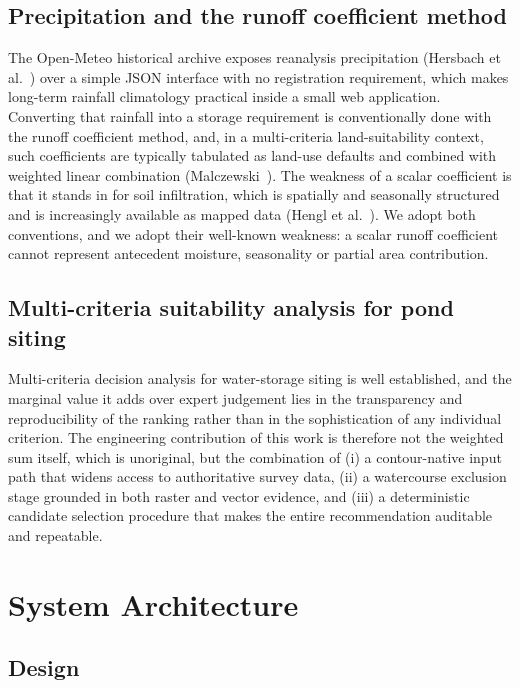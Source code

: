 \documentclass[sigconf,review,10pt]{acmart}
\begin{document}
\subsection{Precipitation and the runoff coefficient method}

The Open-Meteo historical archive exposes reanalysis precipitation
(Hersbach et al.~\cite{hersbach2020}) over a simple JSON interface with
no registration requirement, which makes long-term rainfall climatology
practical inside a small web application. Converting that rainfall into a
storage requirement is conventionally done with the runoff coefficient
method, and, in a multi-criteria land-suitability context, such
coefficients are typically tabulated as land-use defaults and combined
with weighted linear combination (Malczewski~\cite{malczewski1999}). The
weakness of a scalar coefficient is that it stands in for soil
infiltration, which is spatially and seasonally structured and is
increasingly available as mapped data (Hengl et al.~\cite{hengl2017}). We
adopt both conventions, and we adopt their well-known weakness: a scalar
runoff coefficient cannot represent antecedent moisture, seasonality or
partial area contribution.

\subsection{Multi-criteria suitability analysis for pond siting}

Multi-criteria decision analysis for water-storage siting is
well established, and the marginal value it adds over expert judgement
lies in the transparency and reproducibility of the ranking rather than in
the sophistication of any individual criterion. The engineering contribution
of this work is therefore not the weighted sum itself, which is
unoriginal, but the combination of (i) a contour-native input path that
widens access to authoritative survey data, (ii) a watercourse exclusion
stage grounded in both raster and vector evidence, and (iii) a
deterministic candidate selection procedure that makes the entire
recommendation auditable and repeatable.

\section{System Architecture}
\label{sec:arch}

\subsection{Design}
\end{document}
